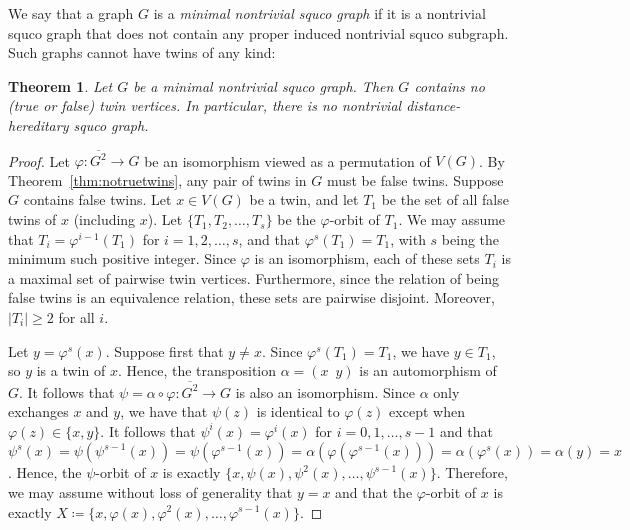 \documentclass[12pt]{article}
\newtheorem{theorem}{Theorem}[section]
\newcommand{\sq}[1]{\overline{#1^2}}
\begin{document}
We say that a graph $G$ is a \emph{minimal nontrivial squco graph} if it is a nontrivial squco graph that does not contain any proper induced nontrivial squco subgraph.  
Such graphs cannot have twins of any kind:

\begin{theorem}\label{thm:notwins}
  Let $G$ be a minimal nontrivial squco graph. 
  Then $G$ contains no (true or false) twin vertices. 
  In particular, there is no nontrivial distance-hereditary squco graph.
\end{theorem}

\begin{proof}
  Let $\varphi\colon \sq{G}\rightarrow G$ be an isomorphism viewed as a permutation of $V(G)$. 
  By Theorem~\ref{thm:notruetwins}, any pair of twins in $G$ must be false twins.  
  Suppose $G$ contains false twins.  
  Let $x\in V(G)$ be a twin, and let $T_1$ be the set of all false twins of $x$ (including $x$).  
  Let $\{T_{1}, T_{2}, \ldots, T_{s}\}$ be the $\varphi$-orbit of $T_{1}$. 
  We may assume that $T_{i} = \varphi^{i-1}(T_{1})$ for
  $i=1,2,\ldots, s$, and that $\varphi^{s}(T_{1}) = T_{1}$, with $s$ being the minimum such positive integer.  
  Since $\varphi$ is an isomorphism, each of these sets $T_{i}$ is a maximal set of pairwise twin vertices.
  Furthermore, since the relation of being false twins is an
  equivalence relation, these sets are pairwise disjoint. 
  Moreover, $|T_{i}|\geq 2$ for all $i$.

  Let $y=\varphi^s(x)$. 
  Suppose first that $y\neq x$.  
  Since $\varphi^{s}(T_{1}) = T_{1}$, we have $y\in T_{1}$, so $y$ is a twin of $x$.  
  Hence, the transposition $\alpha = (x\,\,\, y)$ is an automorphism of $G$.  
  It follows that $\psi = \alpha\circ \varphi \colon\sq{G} \rightarrow G$ is also an isomorphism. 
  Since $\alpha$ only exchanges $x$ and $y$, we have that $\psi(z)$ is identical to $\varphi(z)$ except when $\varphi(z)\in \{x,y\}$. 
  It follows that $\psi^{i}(x) = \varphi^{i}(x)$ for $i=0,1,\ldots, s-1$ and that $\psi^{s}(x) = \psi(\psi^{s-1}(x)) = \psi(\varphi^{s-1}(x)) = \alpha(\varphi(\varphi^{{s-1}}(x))) = \alpha(\varphi^{s}(x)) = \alpha(y) = x$. 
  Hence, the $\psi$-orbit of $x$ is exactly $\{x, \psi(x), \psi^2(x), \ldots, \psi^{s-1}(x)\}$.  
  Therefore, we may assume without loss of generality that $y=x$ and that the $\varphi$-orbit of $x$ is exactly
  $X \coloneqq\{x, \varphi(x), \varphi^2(x), \ldots, \varphi^{s-1}(x)\}$.


\end{proof}
\end{document}
